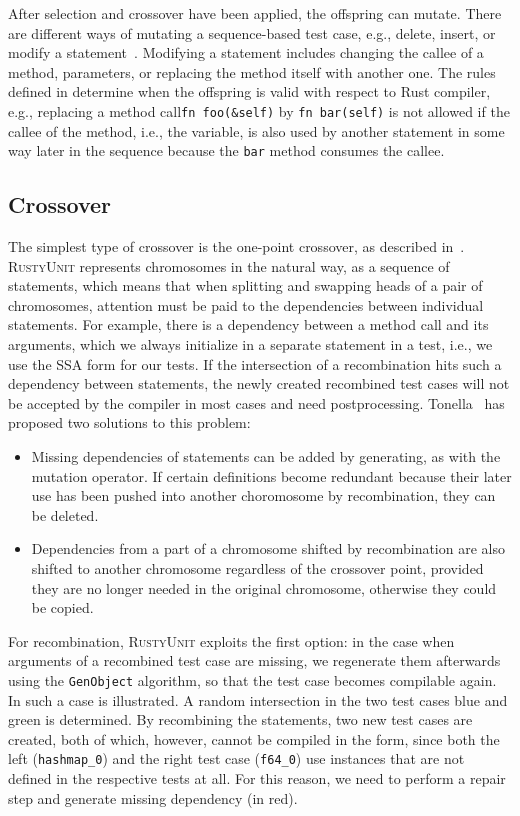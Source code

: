 \documentclass[paper=a4,%
  twoside,%
  BCOR4mm,%
  abstract=true,%
  toc=bibliography,%
  chapterprefix=true,%
  toc=bibliographynumbered,%
  open=right,%
  english,%
  pagesize=pdftex]{scrreprt}
\newcommand{\tech}{\textsc{RustyUnit}\xspace}
\begin{document}
After selection and crossover have been applied, the offspring can mutate. There are different ways of mutating a sequence-based test case, e.g., delete, insert, or modify a statement~\cite{Fraser2012}. Modifying a statement includes changing the callee of a method, parameters, or replacing the method itself with another one. The rules defined in  determine when the offspring is valid with respect to Rust compiler, e.g., replacing a method call\texttt{fn foo(\string&self)} by \texttt{fn bar(self)} is not allowed if the callee of the method, i.e., the variable, is also used by another statement in some way later in the sequence because the \texttt{bar} method consumes the callee. 

\subsection{Crossover}
The simplest type of crossover is the one-point crossover, as described in~. \tech represents chromosomes in the natural way, as a sequence of statements, which means that when splitting and swapping heads of a pair of chromosomes, attention must be paid to the dependencies between individual statements. For example, there is a dependency between a method call and its arguments, which we always initialize in a separate statement in a test, i.e., we use the \ac{SSA} form for our tests. If the intersection of a recombination hits such a dependency between statements, the newly created recombined test cases will not be accepted by the compiler in most cases and need postprocessing. Tonella~\cite{Tonella2004} has proposed two solutions to this problem:

\begin{itemize}
    \item Missing dependencies of statements can be added by generating, as with the mutation operator. If certain definitions become redundant because their later use has been pushed into another choromosome by recombination, they can be deleted.
    \item Dependencies from a part of a chromosome shifted by recombination are also shifted to another chromosome regardless of the crossover point, provided they are no longer needed in the original chromosome, otherwise they could be copied.
\end{itemize}

For recombination, \tech exploits the first option: in the case when arguments of a recombined test case are missing, we regenerate them afterwards using the \texttt{GenObject} algorithm, so that the test case becomes compilable again. In  such a case is illustrated. A random intersection in the two test cases blue and green is determined. By recombining the statements, two new test cases are created, both of which, however, cannot be compiled in the form, since both the left (\texttt{hashmap\string_0}) and the right test case (\texttt{f64\string_0}) use instances that are not defined in the respective tests at all. For this reason, we need to perform a repair step and generate missing dependency (in red).
\end{document}
